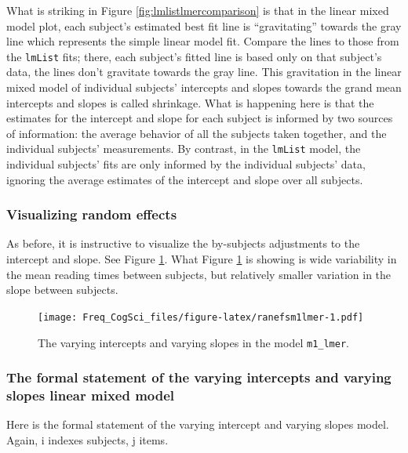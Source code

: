 \documentclass[
  12pt,
]{krantz}
\theoremstyle{definition}
\theoremstyle{definition}
\theoremstyle{definition}
\theoremstyle{definition}
\theoremstyle{remark}
\begin{document}
What is striking in Figure \ref{fig:lmlistlmercomparison} is that in the linear mixed model plot, each subject's estimated best fit line is ``gravitating'' towards the gray line which represents the simple linear model fit. Compare the lines to those from the \texttt{lmList} fits; there, each subject's fitted line is based only on that subject's data, the lines don't gravitate towards the gray line. This gravitation in the linear mixed model of individual subjects' intercepts and slopes towards the grand mean intercepts and slopes is called shrinkage. What is happening here is that the estimates for the intercept and slope for each subject is informed by two sources of information: the average behavior of all the subjects taken together, and the individual subjects' measurements. By contrast, in the \texttt{lmList} model, the individual subjects' fits are only informed by the individual subjects' data, ignoring the average estimates of the intercept and slope over all subjects.

\hypertarget{visualizing-random-effects}{%
\subsubsection{Visualizing random effects}\label{visualizing-random-effects}}

As before, it is instructive to visualize the by-subjects adjustments to the intercept and slope. See Figure \ref{fig:ranefsm1lmer}.
What Figure \ref{fig:ranefsm1lmer} is showing is wide variability in the mean reading times between subjects, but relatively smaller variation in the slope between subjects.

\begin{figure}
\centering
\texttt{[image: Freq\_CogSci\_files/figure-latex/ranefsm1lmer-1.pdf]}
\caption{\label{fig:ranefsm1lmer}The varying intercepts and varying slopes in the model \texttt{m1\_lmer}.}
\end{figure}

\hypertarget{the-formal-statement-of-the-varying-intercepts-and-varying-slopes-linear-mixed-model}{%
\subsubsection{The formal statement of the varying intercepts and varying slopes linear mixed model}\label{the-formal-statement-of-the-varying-intercepts-and-varying-slopes-linear-mixed-model}}

Here is the formal statement of the varying intercept and varying slopes model. Again, i indexes subjects, j items.
\end{document}
